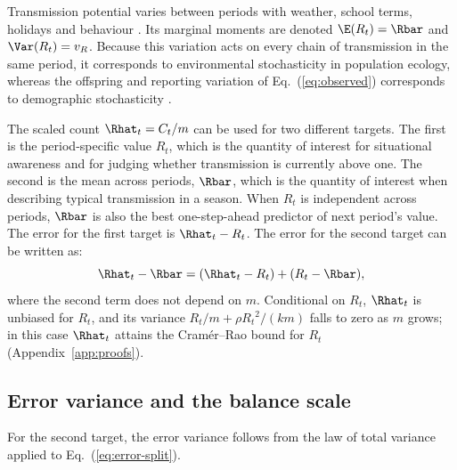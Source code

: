 Transmission potential varies between periods with weather, school terms, holidays and behaviour \citep{dalziel2018urbanization}. Its marginal moments are denoted $\E(R_t)=\Rbar$ and $\Var(R_t)=v_R$. Because this variation acts on every chain of transmission in the same period, it corresponds to environmental stochasticity in population ecology, whereas the offspring and reporting variation of Eq.~(\ref{eq:observed}) corresponds to demographic stochasticity \citep{engen1998demographic, lande2003stochastic}.

The scaled count $\Rhat_t=C_t/m$ can be used for two different targets. The first is the period-specific value $R_t$, which is the quantity of interest for situational awareness and for judging whether transmission is currently above one. The second is the mean across periods, $\Rbar$, which is the quantity of interest when describing typical transmission in a season. When $R_t$ is independent across periods, $\Rbar$ is also the best one-step-ahead predictor of next period's value. The error for the first target is $\Rhat_t-R_t$. The error for the second target can be written as:
\begin{equation}
  \Rhat_t-\Rbar=(\Rhat_t-R_t)+(R_t-\Rbar),
  \label{eq:error-split}
\end{equation}
where the second term does not depend on $m$. Conditional on $R_t$, $\Rhat_t$ is unbiased for $R_t$, and its variance $R_t/m+\rho R_t{}^2/(km)$ falls to zero as $m$ grows; in this case $\Rhat_t$ attains the Cram\'er--Rao bound for $R_t$ (Appendix~\ref{app:proofs}).

\subsection{Error variance and the balance scale}
\label{sec:bg-variance}

For the second target, the error variance follows from the law of total variance applied to Eq.~(\ref{eq:error-split}).

